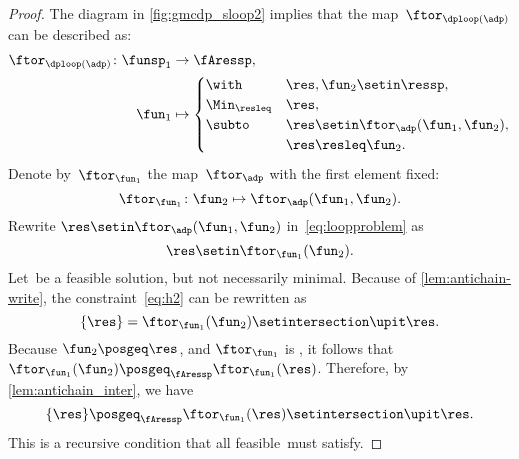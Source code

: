 \begin{proof}
    The diagram in \cref{fig:gmcdp_sloop2} implies that the map~$\ftor_{\dploop(\adp)}$
    can be described as:
    \begin{align}
        \ftor_{\dploop(\adp)}\colon\funsp_{1} & \to\fAressp,\label{eq:loopproblem} \\
        \fun_{1}                              & \mapsto\begin{cases}
                                                           \with          & \res,\fun_{2}\setin\ressp,                 \\
                                                           \Min_{\resleq} & \res,                                      \\
                                                           \subto         & \res\setin\ftor_{\adp}(\fun_{1},\fun_{2}), \\
                                                                          & \res\resleq\fun_{2}.
                                                       \end{cases}
    \end{align}
    Denote by~$\ftor_{\fun_{1}}$ the map~$\ftor_{\adp}$ with the first element fixed:
    \begin{equation*}
        \ftor_{\fun_{1}}\colon\fun_{2}\mapsto\ftor_{\adp}(\fun_{1},\fun_{2}).
    \end{equation*}
    Rewrite $\res\setin\ftor_{\adp}(\fun_{1},\fun_{2})$ in~\cref{eq:loopproblem} as
    \begin{equation}
        \res\setin\ftor_{\fun_{1}}(\fun_{2}).
        \label{eq:h2}
    \end{equation}
    Let~\res be a feasible solution, but not necessarily minimal.
    Because of \cref{lem:antichain-write}, the constraint~\cref{eq:h2} can be rewritten as
    \begin{equation}
        \{\res\}=\ftor_{\fun_{1}}(\fun_{2})\setintersection\upit\res.
        \label{eq:h3}
    \end{equation}
    Because $\fun_{2}\posgeq\res$, and $\ftor_{\fun_{1}}$ is \scottcontinuous, it follows that~$\ftor_{\fun_{1}}(\fun_{2})\posgeq_{\fAressp}\ftor_{\fun_{1}}(\res)$.
    Therefore, by \cref{lem:antichain_inter}, we have
    \begin{equation}
        \{\res\}\posgeq_{\fAressp}\ftor_{\fun_{1}}(\res)\setintersection\upit\res.
        \label{eq:fea}
    \end{equation}
    This is a recursive condition that all feasible~\res must satisfy.


\end{proof}
